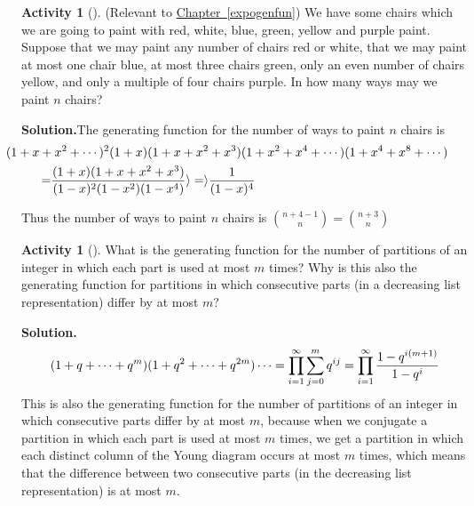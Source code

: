\documentclass[10pt,]{book}
\theoremstyle{plain}
\theoremstyle{definition}
\newtheorem{activity}[project]{Activity}
\numberwithin{equation}{chapter}
\newcommand{\amp}{&}
\begin{document}
\begin{activity}[]\label{activity-219}
(Relevant to \hyperref[expogenfun]{Chapter~\ref{expogenfun}}) We have some chairs which we are going to paint with red, white, blue, green, yellow and purple paint. Suppose that we may paint any number of chairs red or white, that we may paint at most one chair blue, at most three chairs green, only an even number of chairs yellow, and only a multiple of four chairs purple. In how many ways may we paint \(n\) chairs?%
\par\medskip\noindent%
\textbf{Solution.}\quad The generating function for the number of ways to paint \(n\) chairs is%
\begin{align*}
\amp \hspace{-.5in}(1+x+x^2+\cdots)^2(1+x)(1+x+x^2+x^3)(1+x^2+x^4+\cdots)
(1+x^4+x^8+\cdots)\\
=\amp
\frac{(1+x)(1+x+x^2+x^3)}{(1-x)^2(1-x^2)(1-x^4)}\rangle =\rangle  \frac{1}{(1-x)^4}
\end{align*}
%
\par
Thus the number of ways to paint \(n\) chairs is \(\binom{n+4-1}{n}=\binom{n+3}{n}\)%
\end{activity}
\begin{activity}[]\label{activity-220}
What is the generating function for the number of partitions of an integer in which each part is used at most \(m\) times? Why is this also the generating function for partitions in which consecutive parts (in a decreasing list representation) differ by at most \(m\)?%
\par\medskip\noindent%
\textbf{Solution.}\quad %
\begin{equation*}
(1+q+\cdots+q^m)(1+q^2 +\cdots+q^{2m})\cdots
=\prod_{i=1}^\infty\sum_{j=0}^m q^{ij}\\
=\prod_{i=1}^\infty \frac{1-q^{i(m+1)}}{1-q^i}
\end{equation*}
This is also the generating function for the number of partitions of an integer in which consecutive parts differ by at most \(m\), because when we conjugate a partition in which each part is used at most \(m\) times, we get a partition in which each distinct column of the Young diagram occurs at most \(m\) times, which means that the difference between two consecutive parts (in the decreasing list representation) is at most \(m\).%
\end{activity}
\typeout{************************************************}
\typeout{************************************************}
\end{document}
